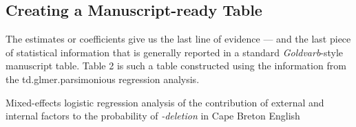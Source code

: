 \documentclass[
  10pt,
  letterpaper]{article}
\renewcommand\texttt[1]{{\ttfamily\color{BrickRed}#1}}
\begin{document}
\hypertarget{creating-a-manuscript-ready-table}{%
\subsection{Creating a Manuscript-ready
Table}\label{creating-a-manuscript-ready-table}}

The estimates or coefficients give us the last line of evidence --- and
the last piece of statistical information that is generally reported in
a standard \emph{Goldvarb}-style manuscript table. Table 2 is such a
table constructed using the information from the
\texttt{td.glmer.parsimonious} regression analysis.

\begin{table}[h]
\begin{center}
\caption{Mixed-effects logistic regression analysis of the contribution of external and internal factors to the probability of \textit{-deletion} in Cape Breton English}


\end{center}
\end{table}
\end{document}
